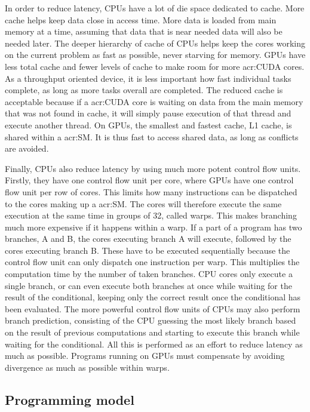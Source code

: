 In order to reduce latency, CPUs have a lot of die space dedicated to cache. More cache helps keep
data close in access time. More data is loaded from main memory at a time, assuming that data that
is near needed data will also be needed later. The deeper hierarchy of cache of CPUs helps keep the
cores working on the current problem as fast as possible, never starving for memory. GPUs have less
total cache and fewer levels of cache to make room for more \acrshort{acr:CUDA} cores. As a
throughput oriented device, it is less important how fast individual tasks complete, as long as more
tasks overall are completed. The reduced cache is acceptable because if a \acrshort{acr:CUDA} core
is waiting on data from the main memory that was not found in cache, it will simply pause execution
of that thread and execute another thread. On GPUs, the smallest and fastest cache, L1 cache, is
shared within a \acrshort{acr:SM}. It is thus fast to access shared data, as long as conflicts are
avoided.

Finally, CPUs also reduce latency by using much more potent control flow units. Firstly, they have
one control flow unit per core, where GPUs have one control flow unit per row of cores. This limits
how many instructions can be dispatched to the cores making up a \acrshort{acr:SM}. The cores will
therefore execute the same execution at the same time in groups of 32, called warps. This makes
branching much more expensive if it happens within a warp. If a part of a program has two branches,
A and B, the cores executing branch A will execute, followed by the cores executing branch B. These
have to be executed sequentially because the control flow unit can only dispatch one instruction per
warp. This multiplies the computation time by the number of taken branches. CPU cores only execute a
single branch, or can even execute both branches at once while waiting for the result of the
conditional, keeping only the correct result once the conditional has been evaluated. The more
powerful control flow units of CPUs may also perform branch prediction, consisting of the CPU
guessing the most likely branch based on the result of previous computations and starting to execute
this branch while waiting for the conditional. All this is performed as an effort to reduce latency
as much as possible. Programs running on GPUs must compensate by avoiding divergence as much as
possible within warps.

\subsection{Programming model} \label{subsection:graphics_processing_units:architecture:programming_model}

